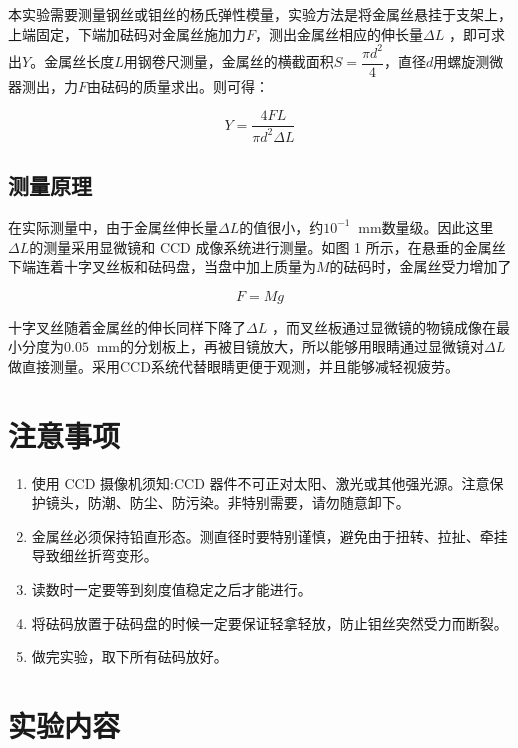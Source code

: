 \documentclass[11pt]{article}
\newcommand*{\unit}[1]{\mathop{}\!\mathrm{#1}}
\begin{document}
本实验需要测量钢丝或钼丝的杨氏弹性模量，实验方法是将金属丝悬挂于支架上，上端固定，下端加砝码对金属丝施加力$F$，测出金属丝相应的伸长量$\Delta L$ ，即可求出$Y$。金属丝长度$L$用钢卷尺测量，金属丝的横截面积$S = \dfrac{\pi d^2}{4}$，直径$d$用螺旋测微器测出，力$F$由砝码的质量求出。则可得：

\begin{equation}
    Y = \frac{4FL}{\pi d^2 \Delta L}
\end{equation}

\subsection{测量原理}

在实际测量中，由于金属丝伸长量$\Delta L$的值很小，约$10^{-1} \unit{mm}$数量级。因此这里$\Delta L$的测量采用显微镜和 CCD 成像系统进行测量。如图 1 所示，在悬垂的金属丝下端连着十字叉丝板和砝码盘，当盘中加上质量为$M$的砝码时，金属丝受力增加了

\begin{equation}
    F = Mg
\end{equation}

十字叉丝随着金属丝的伸长同样下降了$\Delta L$ ，而叉丝板通过显微镜的物镜成像在最小分度为$0.05\unit{mm}$的分划板上，再被目镜放大，所以能够用眼睛通过显微镜对$\Delta L$做直接测量。采用CCD系统代替眼睛更便于观测，并且能够减轻视疲劳。

\section{注意事项}

\begin{enumerate}
    \item 使用 CCD 摄像机须知:CCD 器件不可正对太阳、激光或其他强光源。注意保护镜头，防潮、防尘、防污染。非特别需要，请勿随意卸下。
    \item 金属丝必须保持铅直形态。测直径时要特别谨慎，避免由于扭转、拉扯、牵挂导致细丝折弯变形。
    \item 读数时一定要等到刻度值稳定之后才能进行。
    \item 将砝码放置于砝码盘的时候一定要保证轻拿轻放，防止钼丝突然受力而断裂。
    \item 做完实验，取下所有砝码放好。
\end{enumerate}

\section{实验内容}
\end{document}
